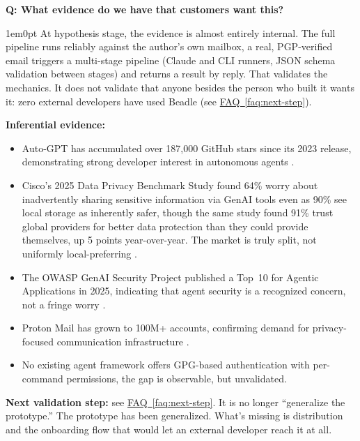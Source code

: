\documentclass[11pt,letterpaper]{article}
\newcounter{faqnum}
\newenvironment{faqpair}[1]{%
  \needspace{4\baselineskip}%
  \vspace{0.5em}%
  \refstepcounter{faqnum}%
  \noindent\textbf{\color{SectionBlue}Q\thefaqnum: #1}\par\nopagebreak[4]%
  \vspace{0.2em}%
  \begin{adjustwidth}{1em}{0pt}%
  \setlength{\parindent}{0pt}%
}{%
  \end{adjustwidth}%
  \vspace{0.5em}%
}
\newcommand{\faqref}[1]{\hyperref[#1]{FAQ~\ref*{#1}}}
\begin{document}
\begin{faqpair}{What evidence do we have that customers want this?}\label{faq:customer-evidence}
  At hypothesis stage, the evidence is almost entirely internal. The
  full pipeline runs reliably against the author's own mailbox, a
  real, PGP-verified email triggers a multi-stage pipeline (Claude and
  CLI runners, JSON schema validation between stages) and returns a
  result by reply. That validates the mechanics. It does not validate
  that anyone besides the person who built it wants it: zero external
  developers have used Beadle (see \faqref{faq:next-step}).

  \textbf{Inferential evidence:}
  \begin{itemize}[nosep]
    \item Auto-GPT has accumulated over 187,000 GitHub stars since its 2023
      release, demonstrating strong developer interest in autonomous agents
      \cite{autogpt2024github}.
    \item Cisco's 2025 Data Privacy Benchmark Study found 64\% worry about
      inadvertently sharing sensitive information via GenAI tools even as
      90\% see local storage as inherently safer, though the same study
      found 91\% trust global providers for better data protection than
      they could provide themselves, up 5 points year-over-year. The market
      is truly split, not uniformly local-preferring
      \cite{cisco2025privacy}.
    \item The OWASP GenAI Security Project published a Top~10 for Agentic
      Applications in 2025, indicating that agent security is a recognized
      concern, not a fringe worry \cite{owasp2025agentic}.
    \item Proton Mail has grown to 100M+ accounts, confirming demand for
      privacy-focused communication infrastructure \cite{proton2024100m}.
    \item No existing agent framework offers GPG-based authentication with
      per-command permissions, the gap is observable, but unvalidated.
  \end{itemize}

  \textbf{Next validation step:} see \faqref{faq:next-step}. It is no
  longer ``generalize the prototype.'' The prototype has been generalized.
  What's missing is distribution and the onboarding flow that would let
  an external developer reach it at all.
\end{faqpair}
\end{document}
